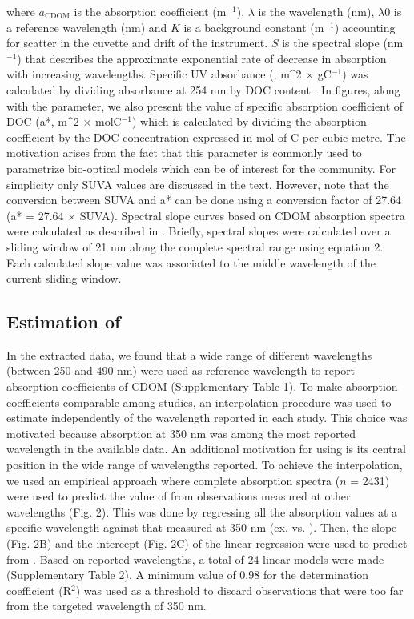 where $a_{\text{CDOM}}$ is the absorption coefficient (m$^{-1}$), $\lambda$ is the wavelength (nm), $\lambda0$ is a reference wavelength (nm) and $K$ is a background constant (m$^{-1}$) accounting for scatter in the cuvette and drift of the instrument. $S$ is the spectral slope (nm$^{-1}$) that describes the approximate exponential rate of decrease in absorption with increasing wavelengths. Specific UV absorbance (, m^2 $\times$ gC$^{-1}$) was calculated by dividing absorbance at 254 nm by DOC content \citep{Weishaar2003}. In figures, along with the  parameter, we also present the value of specific absorption coefficient  of DOC (a*, m^2 $\times$ molC$^{-1}$) which is calculated by dividing the absorption coefficient by the DOC concentration expressed in mol of C per cubic metre. The motivation arises from the fact that this parameter is commonly used to parametrize bio-optical models which can be of interest for the community. For simplicity only SUVA values are discussed in the text. However, note that the conversion between SUVA and a* can be done using a conversion factor of 27.64 (a* = 27.64 $\times$ SUVA). Spectral slope curves based on CDOM absorption spectra were calculated as described in \citet{Loiselle2009}. Briefly, spectral slopes were calculated over a sliding window of 21 nm along the complete spectral range using equation 2. Each calculated slope value was associated to the middle wavelength of the current sliding window.

\subsection*{Estimation of }

In the extracted data, we found that a wide range of different wavelengths (between 250 and 490 nm) were used as reference wavelength to report absorption coefficients of CDOM (Supplementary Table 1). To make absorption coefficients comparable among studies, an interpolation procedure was used to estimate  independently of the wavelength reported in each study. This choice was motivated because absorption at 350 nm was among the most reported wavelength in the available data. An additional motivation for using  is its central position in the wide range of wavelengths reported. To achieve the interpolation, we used an empirical approach where complete absorption spectra ($n$ = 2431) were used to predict the value of  from observations measured at other wavelengths (Fig. 2). This was done by regressing all the absorption values at a specific wavelength against that measured at 350 nm (ex.  vs. ). Then, the slope (Fig. 2B) and the intercept (Fig. 2C) of the linear regression were used to predict  from \acdom{\lambda}. Based on reported wavelengths, a total of 24 linear models were made (Supplementary Table 2). A minimum value of 0.98 for the determination coefficient (R$^2$) was used as a threshold to discard observations that were too far from the targeted wavelength of 350 nm.

